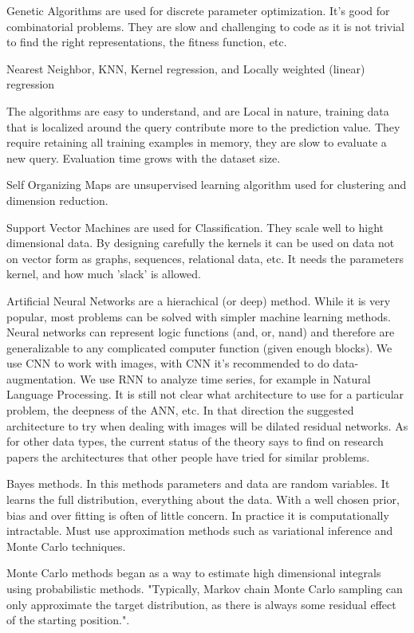 \documentclass[11pt,letterpaper]{report}
\begin{document}
Genetic Algorithms are used for discrete parameter optimization. It's good for combinatorial problems.
They are slow and  challenging to code as it is not trivial to  find the right representations, the fitness function, etc.




Nearest Neighbor, KNN, Kernel regression, and Locally weighted (linear) regression

The algorithms are easy to understand, and are Local in nature, training data that is localized around the query contribute more to the prediction value.
They require retaining all training examples in memory, they are slow to evaluate a new query. Evaluation time grows with the dataset size.

Self Organizing Maps are unsupervised learning algorithm used for clustering and dimension reduction.


Support Vector Machines are used for Classification.
They scale well to hight dimensional data.
By designing carefully the kernels it can be used on data not on vector form as graphs, sequences, relational data, etc. It needs the parameters kernel, and how much 'slack' is allowed.


Artificial Neural Networks are a hierachical (or deep) method. While it is very popular, most problems can be solved with simpler machine learning methods\cite{Gron}. Neural networks can represent logic functions (and, or, nand) and therefore are generalizable to any complicated computer function (given enough blocks). We use CNN to work with images, with CNN it's recommended to do data-augmentation. We use RNN to analyze time series, for example in Natural Language Processing.
It is still not clear what architecture\cite{Lin2017} to use for a particular problem,   the deepness of the ANN, etc. In that direction the suggested architecture to try when dealing with images will be dilated residual networks\cite{DRN}. As for other data types, the current status of the theory says to find on research papers the architectures that other people have tried for similar problems.


Bayes methods. In this methods parameters and data are random variables. It learns the full distribution, everything about the data. With a well chosen prior, bias and over fitting is often of little concern. In practice it is computationally intractable. Must use approximation methods such as variational inference and Monte Carlo techniques.

 Monte Carlo methods began as a way to estimate high dimensional integrals using probabilistic methods. "Typically, Markov chain Monte Carlo sampling can only approximate the target distribution, as there is always some residual effect of the starting position."\cite{wmcmc}.
\end{document}
